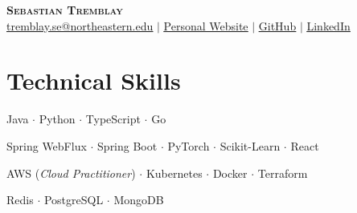 \documentclass[letterpaper,11pt]{article}
\begin{document}

\begin{center}
    \textbf{\Huge \scshape Sebastian Tremblay} 
    \\ \vspace{1pt}
    \small
    \href{mailto:tremblay.se@northeastern.edu}{\uline{tremblay.se@northeastern.edu}} $|$
    \href{https://www.sebytremblay.com}{\uline{Personal Website}} $|$
    \href{https://github.com/sebytremblay}{\uline{GitHub}} $|$
    \href{https://www.linkedin.com/in/sebastiantremblay/}{\uline{LinkedIn}}
\end{center}

\section{Technical Skills}
 \begin{description}[leftmargin=!,labelwidth=\widthof{\textsc{Frameworks/Libraries}}, itemsep=0.5pt, parsep=0.5pt, font=\normalfont\small]
    \item[\textsc{Languages:}] \small Java $\cdot$ Python $\cdot$ TypeScript $\cdot$ Go
    \item[\textsc{Frameworks/Libraries:}]  Spring WebFlux $\cdot$ Spring Boot $\cdot$ PyTorch $\cdot$ Scikit-Learn $\cdot$ React
    \item[\textsc{Cloud/DevOps:}] \small AWS (\textit{Cloud Practitioner}) $\cdot$ Kubernetes $\cdot$ Docker $\cdot$ Terraform
    \item[\textsc{Databases:}] \small Redis $\cdot$ PostgreSQL $\cdot$ MongoDB
    
\end{description}
\vspace{-4pt}
\end{document}
